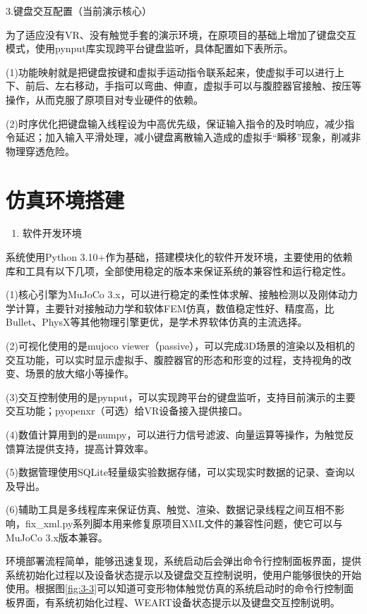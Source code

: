 3.键盘交互配置（当前演示核心）

为了适应没有VR、没有触觉手套的演示环境，在原项目的基础上增加了键盘交互模式，使用pynput库实现跨平台键盘监听，具体配置如下表所示。

(1)功能映射就是把键盘按键和虚拟手运动指令联系起来，使虚拟手可以进行上下、前后、左右移动，手指可以弯曲、伸直，虚拟手可以与腹腔器官接触、按压等操作，从而克服了原项目对专业硬件的依赖。

(2)时序优化把键盘输入线程设为中高优先级，保证输入指令的及时响应，减少指令延迟；加入输入平滑处理，减小键盘离散输入造成的虚拟手``瞬移''现象，削减非物理穿透危险。

\section{仿真环境搭建}

\begin{enumerate}
\def\labelenumi{\arabic{enumi}.}
\item
  软件开发环境
\end{enumerate}

系统使用Python
3.10+作为基础，搭建模块化的软件开发环境，主要使用的依赖库和工具有以下几项，全部使用稳定的版本来保证系统的兼容性和运行稳定性。

(1)核心引擎为MuJoCo
3.x，可以进行稳定的柔性体求解、接触检测以及刚体动力学计算，主要针对接触动力学和软体FEM仿真，数值稳定性好、精度高，比Bullet、PhysX等其他物理引擎更优，是学术界软体仿真的主流选择。

(2)可视化使用的是mujoco
viewer（passive），可以完成3D场景的渲染以及相机的交互功能，可以实时显示虚拟手、腹腔器官的形态和形变的过程，支持视角的改变、场景的放大缩小等操作。

(3)交互控制使用的是pynput，可以实现跨平台的键盘监听，支持目前演示的主要交互功能；pyopenxr（可选）给VR设备接入提供接口。

(4)数值计算用到的是numpy，可以进行力信号滤波、向量运算等操作，为触觉反馈算法提供支持，提高计算效率。

(5)数据管理使用SQLite轻量级实验数据存储，可以实现实时数据的记录、查询以及导出。

(6)辅助工具是多线程库来保证仿真、触觉、渲染、数据记录线程之间互相不影响，fix\_xml.py系列脚本用来修复原项目XML文件的兼容性问题，使它可以与MuJoCo
3.x版本兼容。

环境部署流程简单，能够迅速复现，系统启动后会弹出命令行控制面板界面，提供系统初始化过程以及设备状态提示以及键盘交互控制说明，使用户能够很快的开始使用。根据图\ref{fig:3-3}可以知道可变形物体触觉仿真的系统启动时的命令行控制面板界面，有系统初始化过程、WEART设备状态提示以及键盘交互控制说明。

